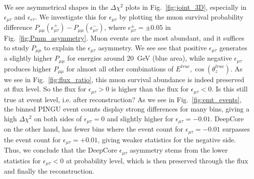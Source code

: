 \documentclass[draft=True]{revtex4-2}
\newcommand{\ztrue}{\ensuremath{\cos{(\theta_z^{true})}}}
\newcommand{\emt}{\ensuremath{\epsilon_{\mu\tau}}}
\newcommand{\eet}{\epsilon_{e\tau}}
\newcommand{\Etrue}{E^{true}}
\begin{document}
{We see asymmetrical shapes in the $\Delta \chi^2$ plots in Fig.~\ref{fig:joint_3D}, especially in $\emt$ and $\eet$.%
We investigate this for $\emt$ by plotting the muon survival probability difference $P_{\mu\mu}(\epsilon^+_{\mu\tau}) - P_{\mu\mu}(\epsilon^-_{\mu\tau})$, where 
$\epsilon^\pm_{\mu\tau} = \pm 0.05$ in Fig.~\ref{fig:Pmm_asymmetry}. Muon events are the most abundant, and it suffices to study $P_{\mu\mu}$ to explain the $\emt$ asymmetry. 
We see see that positive $\emt$ generates a slightly higher $P_{\mu\mu}$ for energies around \SI{20}{\GeV} (blue area),
while negative $\emt$ produces higher $P_{\mu\mu}$ for almost all other combinations of ${\Etrue,\ztrue}$. As we see in Fig.~\ref{fig:flux_ratio}, this muon survival abundance 
is indeed preserved at flux level. So the flux for $\emt>0$ is higher than the flux for $\emt<0$. Is this still true at event level, i.e. after reconstruction? 
As we see in Fig.~\ref{fig:emt_events}, the binned PINGU event counts display strong differences for many bins, giving a high $\Delta \chi^2$ on both sides of $\emt=0$ and slightly higher for $\emt=-0.01$. DeepCore on the other hand, 
has fewer bins where the event count for $\emt=-0.01$ surpasses the event count for $\emt=+0.01$, giving weaker statistics for the negative side. Thus, we conclude that the DeepCore
$\emt$ asymmetry stems from the lower statistics for $\emt< 0 $ at probability level, which is then preserved through the flux and finally the reconstruction. %

}
\end{document}

